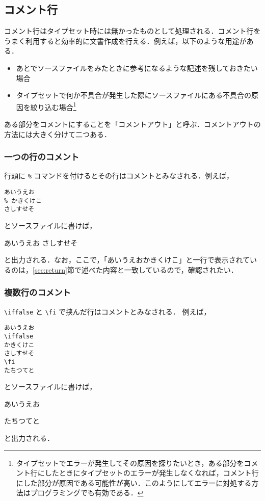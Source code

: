 \subsection{コメント行}

コメント行はタイプセット時には無かったものとして処理される．コメント行をうまく利用すると効率的に文書作成を行える．例えば，以下のような用途がある．

\begin{itemize}
    \item あとでソースファイルをみたときに参考になるような記述を残しておきたい場合
    \item タイプセットで何か不具合が発生した際にソースファイルにある不具合の原因を絞り込む場合\footnote{タイプセットでエラーが発生してその原因を探りたいとき，ある部分をコメント行にしたときにタイプセットのエラーが発生しなくなれば，コメント行にした部分が原因である可能性が高い．このようにしてエラーに対処する方法はプログラミングでも有効である．}
\end{itemize}

ある部分をコメントにすることを「コメントアウト」と呼ぶ．コメントアウトの方法には大きく分けて二つある．

\subsubsection{一つの行のコメント}

行頭に \verb|%| コマンドを付けるとその行はコメントとみなされる．例えば，
\begin{screen}
\begin{verbatim}
あいうえお
% かきくけこ
さしすせそ
\end{verbatim}
\end{screen}
とソースファイルに書けば，
\begin{screen}
あいうえお
さしすせそ
\end{screen}
と出力される．なお，ここで，「あいうえおかきくけこ」と一行で表示されているのは，\ref{sec:return}節で述べた内容と一致しているので，確認されたい．

\subsubsection{複数行のコメント}

\verb|\iffalse| と \verb|\fi| で挟んだ行はコメントとみなされる．
例えば，
\begin{screen}
\begin{verbatim}
あいうえお
\iffalse
かきくけこ
さしすせそ
\fi
たちつてと
\end{verbatim}
\end{screen}
とソースファイルに書けば，
\begin{screen}
あいうえお
\iffalse
かきくけこ
さしすせそ
\fi
たちつてと
\end{screen}
と出力される．

